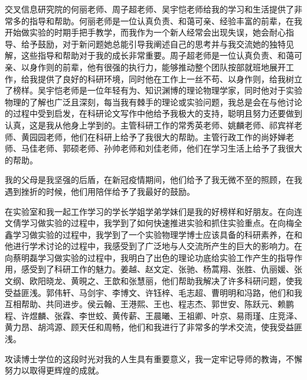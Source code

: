 \begin{acknowledgements}
  交叉信息研究院的何丽老师、周子超老师、吴宇恺老师给我的学习和生活提供了非常多的指导和帮助。何丽老师是一位认真负责、和蔼可亲、经验丰富的前辈，在我开始做实验的时期手把手教学，而我作为一个新人经常会出现失误，她会耐心指导、给予鼓励，对于新问题她总能引导我阐述自己的思考并与我交流她的独特见解，这些指导和帮助对于我的成长非常重要。周子超老师是一位认真负责、和蔼可亲、以身作则的前辈，他有很强的执行力，能够推动整个团队按部就班地展开工作，给我提供了良好的科研环境，同时他在工作上一丝不苟、以身作则，给我树立了榜样。吴宇恺老师是一位年轻有为、知识渊博的理论物理学家，同时他对于实验物理的了解也广泛且深刻，每当我有棘手的理论或实验问题，我总是会在与他讨论的过程中受到启发，在科研论文写作中他给予我极大的支持，聪明且努力还要做到认真，这是我从他身上学到的。主管科研工作的常秀英老师、姚麟老师、祁宾祥老师、黄园园老师，他们在科研上给予了我很大的帮助。主管行政工作的尚妤婵老师、马佳老师、郭硕老师、孙帅老师和刘佳老师，他们在学习生活上给予了我很大的帮助。

  我的父母是我坚强的后盾，在新冠疫情期间，他们给予了我无微不至的照顾，在我遇到挫折的时候，他们用陪伴给予了我最好的鼓励。

  在实验室和我一起工作学习的学长学姐学弟学妹们是我的好榜样和好朋友。在向连文倩学习做实验的过程中，我学到了如何快速推进实验和抓住实验重点。在向梅全鑫学习做实验的过程中，我学到了一个实验物理学博士应该具备的科研素养，在和他进行学术讨论的过程中，我感受到了广泛地与人交流所产生的巨大的影响力。在向蔡明磊学习做实验的过程中，我明白了出色的理论功底给实验工作产生的指导作用，感受到了科研工作的魅力。姜越、赵文定、张驰、杨蒿翔、张胜、仇丽媛、张文纲、欧阳晓龙、黄晛之、王歆和张慧丽，他们帮助我解决了许多科研问题，使我受益匪浅。郭伟轩、马剑宇、李博文、许钰梓、毛志超、曹明明和冯路，他们和我互相帮助、共同进步。侯云翰、王港熙、王也、程志杰、郭世安、陈跃元、赖鹏程、许煜麟、张霖、李世蛟、黄传薪、王晨曦、王祖卿、叶京、易雨瑾、庄竞泽、黄力昂、胡鸿源、顾天任和周畅，他们和我进行了非常多的学术交流，使我受益匪浅。

  攻读博士学位的这段时光对我的人生具有重要意义，我一定牢记导师的教诲，不懈努力以取得更辉煌的成就。


\end{acknowledgements}
